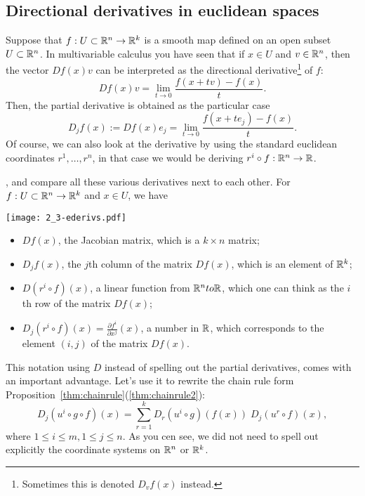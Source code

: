 \subsection{Directional derivatives in euclidean spaces}

Suppose that $f: U\subset\mathbb{R}^n\to\mathbb{R}^k$ is a smooth map defined on an open subset $U\subset \mathbb{R}^n$.
In multivariable calculus you have seen that if $x\in U$ and $v\in\mathbb{R}^n$, then the vector $Df(x) v$ can be interpreted as the directional derivative\footnote{Sometimes this is denoted $D_v f(x)$ instead.} of $f$:
\begin{equation}
    Df(x) v = \lim_{t\to0}\frac{f(x+tv) - f(x)}{t}.
\end{equation}
Then, the partial derivative is obtained as the particular case
\begin{equation}
    D_jf(x) := Df(x) e_j = \lim_{t\to0} \frac{f(x+te_j) - f(x)}{t}.
\end{equation}
Of course, we can also look at the derivative by using the standard euclidean coordinates $r^1, \ldots, r^n$, in that case we would be deriving $r^i \circ f : \mathbb{R}^n \to \mathbb{R}$.

, and compare all these various derivatives next to each other.
For $f:U\subset\mathbb{R}^n\to\mathbb{R}^k$ and $x\in U$, we have
\begin{marginfigure}[3.5cm]
    \texttt{[image: 2\_3-ederivs.pdf]}
\end{marginfigure}
\begin{itemize}
    \item $Df(x)$, the Jacobian matrix, which is a $k\times n$ matrix;
    \item $D_j f(x)$, the $j$th column of the matrix $Df(x)$, which is an element of $\mathbb{R}^k$;
    \item $D(r^i\circ f)(x)$, a linear function from $\mathbb{R}^n to \mathbb{R}$, which one can think as the $i$th row of the matrix $Df(x)$;
    \item $D_j(r^i\circ f)(x) = \frac{\partial f^i}{\partial x^j}(x)$, a number in $\mathbb{R}$, which corresponds to the element $(i,j)$ of the matrix $Df(x)$.
\end{itemize}

This notation using $D$ instead of spelling out the partial derivatives, comes with an important advantage.
Let's use it to rewrite the chain rule form Proposition~\ref{thm:chainrule}(\ref{thm:chainrule2}):
\begin{equation}
    D_j(u^i\circ g \circ f) (x) = \sum_{r=1}^k D_r(u^i\circ g)(f(x))\; D_j(u^r \circ f)(x),
\end{equation}
where $1\leq i\leq m, 1\leq j \leq n$.
As you cen see, we did not need to spell out explicitly the coordinate systems on $\mathbb{R}^n$ or $\mathbb{R}^k$.

